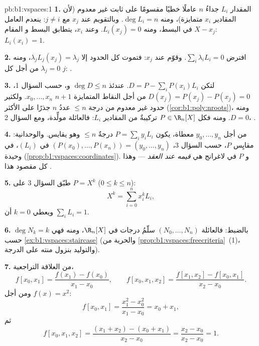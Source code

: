 \begin{solution}{pb:b1:vspaces:1}
\textbf{1.} المقدار $L_i$ جداءُ $n$ عاملًا خطيًا مقسومًا على
ثابت غير معدوم (لأن المقادير $x_i$ متمايزة)، ومنه $\deg L_i = n$.
وبالتقويم عند $x_j$ مع $j \neq i$: ينعدم العامل $X - x_j$ في
البسط، ومنه $L_i(x_j) = 0$. وعند $x_i$، يتطابق البسط و
المقام: $L_i(x_i) = 1$.

\textbf{2.} افترض $\sum_i \lambda_i L_i = 0$. وقوّم عند $x_j$:
فتموت كل الحدود إلا $\lambda_j L_j(x_j) = \lambda_j$، ومنه
$\lambda_j = 0$ من أجل كل $j$: .

\textbf{3.} لتكن $D = P - \sum_i P(x_i) L_i$. عندئذ $\deg D \leq n$
و، حسب السؤال 1، $D(x_j) = P(x_j) - P(x_j) = 0$ من أجل النقاط المتمايزة $n + 1$
$x_0, \dots, x_n$. ولكثير حدود غير معدوم من درجة
$\leq n$ عددُ $n$ جذرًا على الأكثر (\cref{cor:b1:poly:nroots})، ومنه $D
= 0$. ومنه فكل $P \in \R_n[X]$ تركيبةٌ من المقادير $L_i$:
فالعائلة مولِّدة، ومع السؤال 2، .

\textbf{4.} من أجل $y_0, \dots, y_n$ معطاة، يكون  $P = \sum_i
y_i L_i$ درجةٌ $\leq n$ وهو يقايس. والوحدانية: 
مقايِس $P$، حسب السؤال 3،  $(P(x_0), \dots,
P(x_n)) = (y_0, \dots, y_n)$ في  $(L_i)$، 
في  وحيدة (\cref{prop:b1:vspaces:coordinates}). و
 $P$ في  لاغرانج هي \emph{قيمه عند
العقد} --- وهذا كل مقصود هذا .

\textbf{5.} طبّق السؤال 3 على $P = X^k$ ($0 \leq k \leq n$):
\[
X^k = \sum_{i=0}^{n} x_i^{k} L_i ,
\]
ويعطي $k = 0$ أن $\sum_i L_i = 1$.

\textbf{6.} $\deg N_k = k$ بالضبط: فالعائلة $(N_0, \dots, N_n)$
سلّمُ درجات في $\R_n[X]$، ومنه فهي  حسب
\cref{ex:b1:vspaces:staircase} (والحرية من
\cref{prop:b1:vspaces:freecriteria}~(1)، والتوليد بنزول منته
على الدرجة).

\textbf{7.} من العلاقة التراجعية،
\[
f[x_0, x_1] = \frac{f(x_1) - f(x_0)}{x_1 - x_0},
\qquad
f[x_0, x_1, x_2] = \frac{f[x_1, x_2] - f[x_0, x_1]}{x_2 - x_0}.
\]
ومن أجل $f(x) = x^2$:
\[
f[x_0, x_1] = \frac{x_1^2 - x_0^2}{x_1 - x_0} = x_0 + x_1,
\]
ثم
\[
f[x_0, x_1, x_2]
= \frac{(x_1 + x_2) - (x_0 + x_1)}{x_2 - x_0}
= \frac{x_2 - x_0}{x_2 - x_0} = 1 .
\]


\end{solution}
